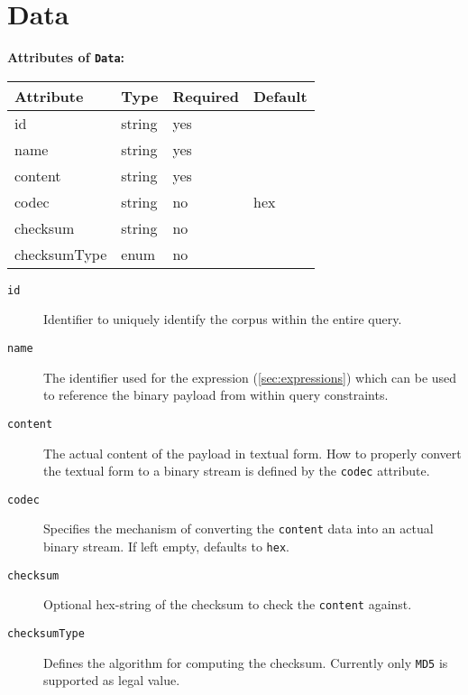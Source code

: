 \documentclass[11pt,a4paper]{report}
\newcommand{\iqlType}[1]{\texttt{\iqlns#1}}
\newenvironment{attributes}[1]{
	\noindent\textbf{Attributes of #1:}\newline\medskip
	\begin{tabular}{|p{0.3\textwidth}|p{0.20\textwidth}|p{0.20\textwidth}|p{0.17\textwidth}|}
		\hline
		\textbf{Attribute} & \textbf{Type} & \textbf{Required} & \textbf{Default} \\ 
		\hline
		\hline
	}{
	\end{tabular}
}
\newcommand{\attribute}[4]{
	#1 & #2 & #3 & #4 \\
	\hline
}
\begin{document}
\section{Data}
\label{sec:json-ld-data}
\begin{attributes}{\iqlType{Data}}
	\attribute{id}{string}{yes}{}
	\attribute{name}{string}{yes}{}
	\attribute{content}{string}{yes}{}
	\attribute{codec}{string}{no}{hex}
	\attribute{checksum}{string}{no}{}
	\attribute{checksumType}{enum}{no}{}
\end{attributes}
\begin{description}
	\item[\iqlType{id}] Identifier to uniquely identify the corpus within the entire query.
	\item[\iqlType{name}] The identifier used for the expression (\ref{sec:expressions}) which can be used to reference the binary payload from within query constraints.
	\item[\iqlType{content}] The actual content of the payload in textual form. How to properly convert the textual form to a binary stream is defined by the \iqlType{codec} attribute.
	\item[\iqlType{codec}] Specifies the mechanism of converting the \iqlType{content} data into an actual binary stream. If left empty, defaults to \texttt{hex}.
	\item[\iqlType{checksum}] Optional hex-string of the checksum to check the \iqlType{content} against.
	\item[\iqlType{checksumType}] Defines the algorithm for computing the checksum. Currently only \texttt{MD5} is supported as legal value.
\end{description}

\end{document}
